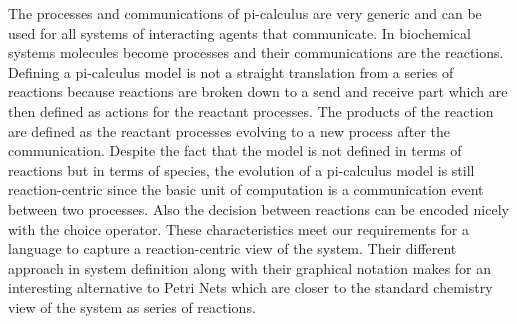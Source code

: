 The processes and communications of pi-calculus are very generic and
can be used for all systems of interacting agents that communicate. In
biochemical systems molecules become processes and their communications
are the reactions. Defining a pi-calculus model is not a straight
translation from a series of reactions because reactions are broken
down to a send and receive part which are then defined as actions for
the reactant processes. The products of the reaction are defined as the
reactant processes evolving to a new process after the
communication. Despite the fact that the model is not defined in
terms of reactions but in terms of species, the evolution of a
pi-calculus model is still reaction-centric since the basic unit of
computation is a communication event between two processes. Also
the decision between reactions can be encoded nicely with the choice
operator. These characteristics meet our requirements for a language
to capture a reaction-centric view of the system. Their different
approach in system definition along with their graphical notation
makes for an interesting alternative to Petri Nets which are closer to
the standard chemistry view of the system as series of reactions.